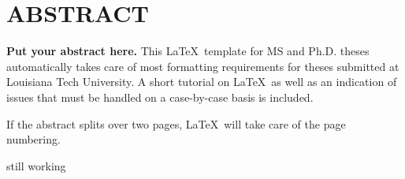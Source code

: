 \chapter*{ABSTRACT}

{\bf Put your abstract here.}
This
\LaTeX \ 
template for MS and Ph.D. theses automatically takes care 
of most formatting requirements for theses submitted at Louisiana
Tech University.
A short tutorial on \LaTeX \ 
as well as an indication of issues that must be 
handled on a case-by-case basis is included.

If the abstract splits over two pages, \LaTeX \ will
take care of the page numbering.


still working 

